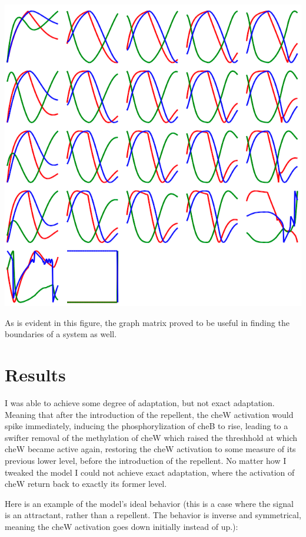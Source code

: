 \documentclass[12pt]{article}
\begin{document}
\includegraphics[scale=0.55]{matrix.png}

As is evident in this figure, the graph matrix proved to be useful in finding the boundaries of a system as well.

\section{Results}

I was able to achieve some degree of adaptation, but not exact adaptation.  Meaning that after the introduction of the repellent, the cheW activation would spike immediately, inducing the phosphorylization of cheB to rise, leading to a swifter removal of the methylation of cheW which raised the threshhold at which cheW became active again, restoring the cheW activation to some measure of its previous lower level, before the introduction of the repellent.  No matter how I tweaked the model I could not achieve exact adaptation, where the activation of cheW return back to exactly its former level.  

Here is an example of the model's ideal behavior (this is a case where the signal is an attractant, rather than a repellent.  The behavior is inverse and symmetrical, meaning the cheW activation goes down initially instead of up.):
\end{document}
